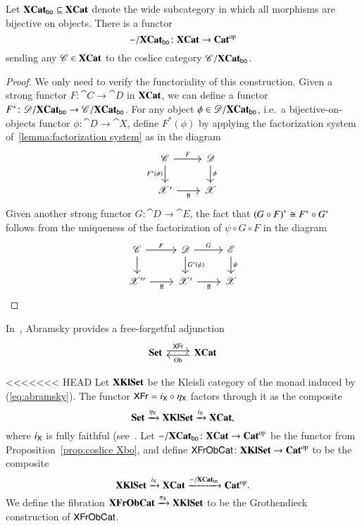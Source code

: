 \documentclass[12pt,oneside,article,draft]{memoir}
\begin{document}
\begin{enumerate}
\begin{proposition}\label{prop:coslice Xbo}
	Let $\mathbf{XCat}_{\mathsf{bo}}\subseteq\mathbf{XCat}$ denote the wide subcategory in which all morphisms are bijective on objects.
	There is a functor 
	$$-/\mathbf{XCat}_{\mathsf{bo}}\colon\mathbf{XCat}\to{\mathbf{Cat}}^{\text{op}}$$
	sending any $\mathscr{C}\in\mathbf{XCat}$ to the coslice category $\mathscr{C}/\mathbf{XCat}_{\mathsf{bo}}$.
\end{proposition}
\begin{proof}
	We only need to verify the functoriality of this construction.
	Given a strong functor $F\colon\cat{C}\to\cat{D}$ in $\mathbf{XCat}$, we can define a functor $F^*\colon\mathscr{D}/\mathbf{XCat}_{\mathsf{bo}}\to\mathscr{C}/\mathbf{XCat}_{\mathsf{bo}}$.
	For any object $\phi\in\mathscr{D}/\mathbf{XCat}_{\mathsf{bo}}$, i.e.~a bijective-on-objects functor $\phi\colon\cat{D}\to\cat{X}$, define $F^*(\phi)$ by applying the factorization system of~\ref{lemma:factorization system} as in the diagram
	\[
	\begin{tikzcd}
		\cat{C} \ar[r,"F"] \ar[d,"F^*(\phi)"'] & \cat{D} \ar[d,"\phi"] \\
		\cat{X}' \ar[r,"\ff"'] & \cat{X}
	\end{tikzcd}
	\]
	Given another strong functor $G\colon\cat{D}\to\cat{E}$, the fact that ${(G\circ F)}^*\cong F^*\circ G^*$ follows from the uniqueness of the factorization of $\psi\circ G\circ F$ in the diagram
	\[
	\begin{tikzcd}
		\cat{C} \ar[r,"F"] \ar[d] 
			& \cat{D} \ar[r,"G"] \ar[d,"G^*(\psi)"] 
		    & \cat{E} \ar[d,"\psi"] \\
		\cat{X}'' \ar[r,"\ff"'] & \cat{X}' \ar[r,"\ff"'] & \cat{X}
	\end{tikzcd}
	\]
\end{proof}

In~\cite{Abramsky?}, Abramsky provides a free-forgetful adjunction
\begin{equation}\label{eq:abramsky}
\begin{tikzcd}
	\Cat{Set}\arrow[r, shift left=.5ex, "\Fun{XFr}"]&\XCat\arrow[l, shift left=.5ex,"\Ob"]
\end{tikzcd}
\end{equation}

\begin{definition}\label{def:XKlSet XFrObCat}
<<<<<<< HEAD
	Let $\mathbf{XKlSet}$ be the Kleisli category of the monad induced by (\ref{eq:abramsky}).
	The functor $\mathsf{XFr}=i_{\mathsf{X}}\circ\eta_{\mathsf{X}}$ factors through it as the composite 
		$$\mathbf{Set}\xrightarrow{\eta_{\mathsf{X}}}\mathbf{XKlSet}\xrightarrow{i_{\mathsf{X}}}\mathbf{XCat},$$ 
	where $i_{\mathsf{X}}$ is fully faithful (see~\cite[Proposition 4.2.1]{Borceux vol 2}.
	Let $-/\mathbf{XCat}_{\mathsf{bo}}\colon\mathbf{XCat}\to{\mathbf{Cat}}^{\text{op}}$ be the functor from Proposition~\ref{prop:coslice Xbo}, and define $\mathsf{XFrObCat}\colon\mathbf{XKlSet}\to{\mathbf{Cat}}^{\text{op}}$ to be the composite
		$$\mathbf{XKlSet}\xrightarrow{i_{\mathsf{X}}}\mathbf{XCat}\xrightarrow{-/\mathbf{XCat}_{\mathsf{bo}}}{\mathbf{Cat}}^{\text{op}}.$$
	We define the fibration $\mathbf{XFrObCat}\xrightarrow{\pi_{\mathsf{X}}}\mathbf{XKlSet}$ to be the Grothendieck construction of $\mathsf{XFrObCat}$. 


\end{definition}
\end{enumerate}
\end{document}
